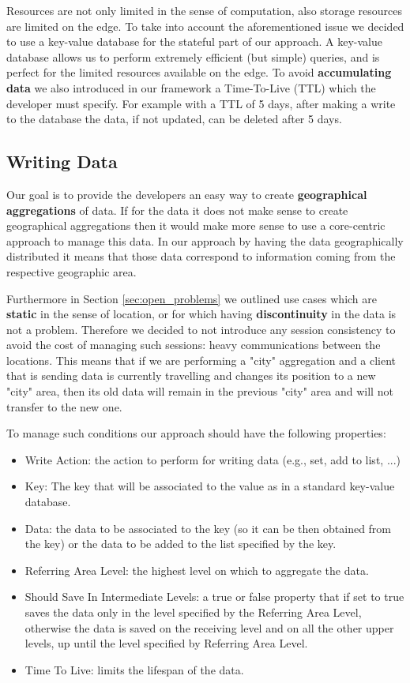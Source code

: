 Resources are not only limited in the sense of computation, also storage resources are limited on the edge. To take into account the aforementioned issue we decided to use a key-value database for the stateful part of our approach. A key-value database allows us to perform extremely efficient (but simple) queries, and is perfect for the limited resources available on the edge. To avoid \textbf{accumulating data} we also introduced in our framework a Time-To-Live (TTL) which the developer must specify. For example with a TTL of 5 days, after making a write to the database the data, if not updated, can be deleted after 5 days.


\subsection{Writing Data}
Our goal is to provide the developers an easy way to create \textbf{geographical aggregations} of data. If for the data it does not make sense to create geographical aggregations then it would make more sense to use a core-centric approach to manage this data. In our approach by having the data geographically distributed it means that those data correspond to information coming from the respective geographic area.

Furthermore in Section \ref{sec:open_problems} we outlined use cases which are \textbf{static} in the sense of location, or for which having \textbf{discontinuity} in the data is not a problem. Therefore we decided to not introduce any session consistency to avoid the cost of managing such sessions: heavy communications between the locations. This means that if we are performing a "city" aggregation and a client that is sending data is currently travelling and changes its position to a new "city" area, then its old data will remain in the previous "city" area and will not transfer to the new one.

To manage such conditions our approach should have the following properties:
\begin{itemize}
    \item Write Action: the action to perform for writing data (e.g., set, add to list, ...)
    \item Key: The key that will be associated to the value as in a standard key-value database.
     \item Data: the data to be associated to the key (so it can be then obtained from the key) or the data to be added to the list specified by the key.
     \item Referring Area Level: the highest level on which to aggregate the data.
     \item Should Save In Intermediate Levels: a true or false property that if set to true saves the data only in the level specified by the Referring Area Level, otherwise the data is saved on the receiving level and on all the other upper levels, up until the level specified by Referring Area Level.
     \item Time To Live: limits the lifespan of the data.
\end{itemize}

